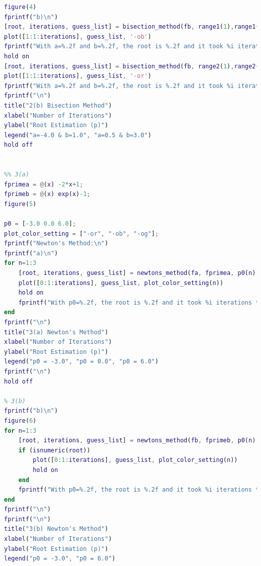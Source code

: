 \documentclass[12pt,letterpaper]{article}
\begin{document}
\begin{lstlisting}[language = Matlab]
%2(b)
figure(4)
fprintf("b)\n")
[root, iterations, guess_list] = bisection_method(fb, range1(1),range1(2), tol);
plot([1:1:iterations], guess_list, '-ob')
fprintf("With a=%.2f and b=%.2f, the root is %.2f and it took %i iterations to find the root\n", range1(1), range1(2), root, iterations)
hold on
[root, iterations, guess_list] = bisection_method(fb, range2(1),range2(2), tol);
plot([1:1:iterations], guess_list, '-or')
fprintf("With a=%.2f and b=%.2f, the root is %.2f and it took %i iterations to find the root\n", range2(1), range2(2), root, iterations)
fprintf("\n")
title("2(b) Bisection Method")
xlabel("Number of Iterations")
ylabel("Root Estimation (p)")
legend("a=-4.0 & b=1.0", "a=0.5 & b=3.0")
hold off


%% 3(a)
fprimea = @(x) -2*x+1;
fprimeb = @(x) exp(x)-1;
figure(5)

p0 = [-3.0 0.0 6.0];
plot_color_setting = ["-or", "-ob", "-og"];
fprintf("Newton's Method:\n")
fprintf("a)\n")
for n=1:3
    [root, iterations, guess_list] = newtons_method(fa, fprimea, p0(n), tol);
    plot([0:1:iterations], guess_list, plot_color_setting(n))
    hold on
    fprintf("With p0=%.2f, the root is %.2f and it took %i iterations to find the root\n", p0(n), root, iterations)
end
fprintf("\n")
title("3(a) Newton's Method")
xlabel("Number of Iterations")
ylabel("Root Estimation (p)")
legend("p0 = -3.0", "p0 = 0.0", "p0 = 6.0")
fprintf("\n")
hold off

% 3(b)
fprintf("b)\n")
figure(6)
for n=1:3
    [root, iterations, guess_list] = newtons_method(fb, fprimeb, p0(n), tol);
    if (isnumeric(root))
        plot([0:1:iterations], guess_list, plot_color_setting(n))
        hold on
    end
    fprintf("With p0=%.2f, the root is %.2f and it took %i iterations to find the root\n", p0(n), root, iterations)
end
fprintf("\n")
fprintf("\n")
title("3(b) Newton's Method")
xlabel("Number of Iterations")
ylabel("Root Estimation (p)")
legend("p0 = -3.0", "p0 = 6.0")
\end{lstlisting}    
\end{document}
